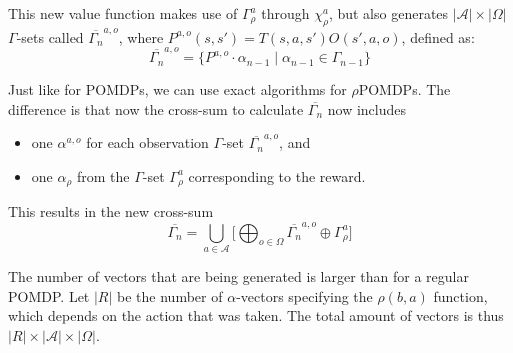 This new value function makes use of $\Gamma_\rho^a$ through $\chi_\rho^a$, but also generates $|\mathcal{A}|\times|\Omega|$ $\Gamma$-sets called $\overline{\Gamma_n}^{a,o}$, where $P^{a,o}(s,s')=T(s,a,s')O(s',a,o)$, defined as:
\begin{equation}
	\overline{\Gamma_n}^{a,o}=\{P^{a,o}\cdot\alpha_{n-1}\mid\alpha_{n-1}\in\Gamma_{n-1}\}
\end{equation}

Just like for POMDPs, we can use exact algorithms for $\rho$POMDPs. The difference is that now the cross-sum to calculate $\overline{\Gamma_n}$ now includes 
\begin{itemize}
	\item one $\alpha^{a,o}$ for each observation $\Gamma$-set $\overline{\Gamma_n}^{a,o}$, and
	\item one $\alpha_\rho$ from the $\Gamma$-set $\Gamma_\rho^a$ corresponding to the reward.
\end{itemize}
This results in the new cross-sum 
\begin{equation}
	\overline{\Gamma_n}=\bigcup_{a\in\mathcal{A}}\big[\bigoplus_{o\in \Omega}\overline{\Gamma_n}^{a,o}\oplus\Gamma_\rho^a\big]
\end{equation}

The number of vectors that are being generated is larger than for a regular POMDP. Let $|R|$ be the number of $\alpha$-vectors specifying the $\rho(b,a)$ function, which depends on the action that was taken. The total amount of vectors is thus $|R| \times |\mathcal{A}| × |\Omega|$.